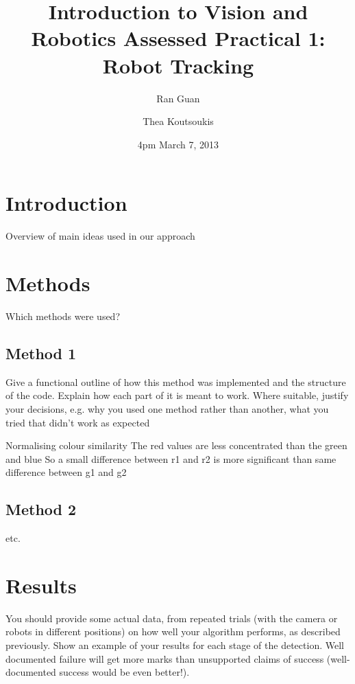 \documentclass{report}
\title{\bf Introduction to Vision and Robotics Assessed Practical 1: Robot Tracking}  %
\author{
	Ran Guan\\
	\and
	Thea Koutsoukis\\            
}
\date{4pm March 7, 2013}
\begin{document}
\maketitle                              %
\setcounter{page}{2}                    %
\tableofcontents         
\renewcommand{\chaptername}{}           %

\chapter{Introduction}                	%
Overview of main ideas used in our approach
 
\chapter{Methods}                		
Which methods were used? 
 
\section{Method 1}                  	%
Give a functional outline of how this method was implemented and the structure of the code. Explain how each part of it is meant to work. Where suitable, justify your
decisions, e.g. why you used one method rather than another, what you tried
that didn't work as expected

Normalising colour similarity 
The red values are less concentrated than the green and blue
So a small difference between r1 and r2 is more significant than same
difference between g1 and g2

\section{Method 2}                  
etc.

\chapter{Results}                
You should provide some actual data, from repeated trials (with the
camera or robots in different positions) on how well your algorithm performs,
as described previously. Show an example of your results for each stage of
the detection. Well documented failure will get more marks than unsupported
claims of success (well-documented success would be even better!).
\end{document}
